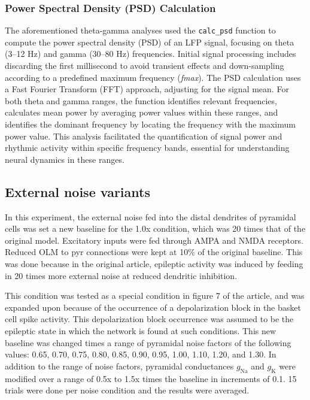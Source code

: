 \subsubsection{Power Spectral Density (PSD) Calculation}
The aforementioned theta-gamma analyses used the \lstinline{calc_psd} function to compute the power spectral density (PSD) of an LFP signal, focusing on theta (3--12 Hz) and gamma (30--80 Hz) frequencies.
Initial signal processing includes discarding the first millisecond to avoid transient effects and down-sampling according to a predefined maximum frequency (\textit{fmax}).
The PSD calculation uses a Fast Fourier Transform (FFT) approach, adjusting for the signal mean.
For both theta and gamma ranges, the function identifies relevant frequencies, calculates mean power by averaging power values within these ranges, and identifies the dominant frequency by locating the frequency with the maximum power value.
This analysis facilitated the quantification of signal power and rhythmic activity within specific frequency bands, essential for understanding neural dynamics in these ranges.

\subsection{External noise variants}
In this experiment, the external noise fed into the distal dendrites of
pyramidal cells was set a new baseline for the 1.0x condition, which was 20 times that of the original
\textcite{sanjayImpairedDendriticInhibition2015} model. Excitatory inputs were fed through
AMPA and NMDA receptors. Reduced OLM to pyr connections were kept at 10\% of
the original baseline. This was done because in the original article, epileptic activity was induced by feeding in 20 times
more external noise at reduced dendritic inhibition.

This condition was tested as a special condition in figure 7 of the article,
and was expanded upon because of the occurrence of a depolarization block in
the basket cell spike activity. This depolarization block occurrence was
assumed to be the epileptic state in which the network is found at such
conditions. This new baseline was changed times a range of pyramidal noise
factors of the following values: 0.65, 0.70, 0.75, 0.80, 0.85, 0.90, 0.95,
1.00, 1.10, 1.20, and 1.30. In addition to the range of noise factors,
pyramidal conductances \(g_{\text{Na}}\) and \(g_{\text{K}}\) were modified
over a range of 0.5x to 1.5x times the baseline in increments of 0.1. 15 trials
were done per noise condition and the results were averaged.


